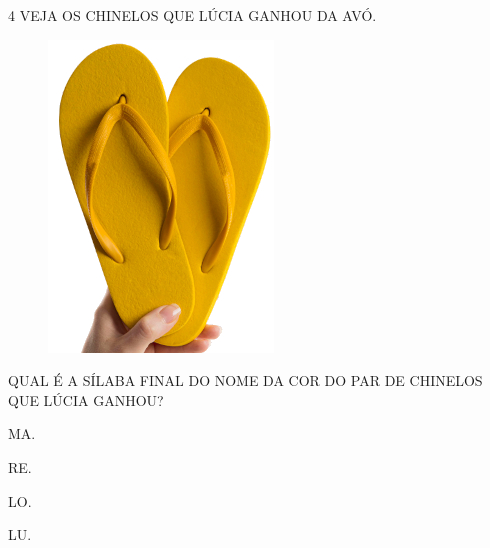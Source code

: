 \vspace{0.5cm}

\num{4} VEJA OS CHINELOS QUE LÚCIA GANHOU DA AVÓ. 

\begin{minipage}{.3\textwidth}
\begin{figure}[H]
\includegraphics[width=\textwidth]{media/image189.jpg}
\end{figure}
\end{minipage}
\hspace{1cm}
\begin{minipage}{.7\textwidth}
QUAL É A SÍLABA FINAL DO NOME DA COR DO PAR DE CHINELOS QUE LÚCIA GANHOU?

\begin{escolha}
\item MA.

\item RE.

\item LO.

\item LU.
\end{escolha}
\end{minipage}


